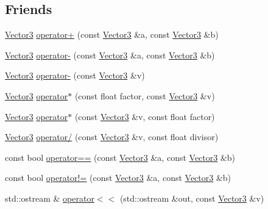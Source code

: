 \subsection*{Friends}
\begin{DoxyCompactItemize}
\item 
\hyperlink{classprism_1_1geometry_1_1_vector3}{Vector3} \hyperlink{classprism_1_1geometry_1_1_vector3_a2f3fba6fd08b1a9ee79193581edead97}{operator+} (const \hyperlink{classprism_1_1geometry_1_1_vector3}{Vector3} \&a, const \hyperlink{classprism_1_1geometry_1_1_vector3}{Vector3} \&b)
\item 
\hyperlink{classprism_1_1geometry_1_1_vector3}{Vector3} \hyperlink{classprism_1_1geometry_1_1_vector3_a4f0726718533ef9da9956faccc4eb5b5}{operator-\/} (const \hyperlink{classprism_1_1geometry_1_1_vector3}{Vector3} \&a, const \hyperlink{classprism_1_1geometry_1_1_vector3}{Vector3} \&b)
\item 
\hyperlink{classprism_1_1geometry_1_1_vector3}{Vector3} \hyperlink{classprism_1_1geometry_1_1_vector3_a0b83b76136fcd64d3d12f50db5db223f}{operator-\/} (const \hyperlink{classprism_1_1geometry_1_1_vector3}{Vector3} \&v)
\item 
\hyperlink{classprism_1_1geometry_1_1_vector3}{Vector3} \hyperlink{classprism_1_1geometry_1_1_vector3_abc31e90d1677fde0ca1ff3e23daae851}{operator$\ast$} (const float factor, const \hyperlink{classprism_1_1geometry_1_1_vector3}{Vector3} \&v)
\item 
\hyperlink{classprism_1_1geometry_1_1_vector3}{Vector3} \hyperlink{classprism_1_1geometry_1_1_vector3_ae7fd15d5dffc5c611e611998321df833}{operator$\ast$} (const \hyperlink{classprism_1_1geometry_1_1_vector3}{Vector3} \&v, const float factor)
\item 
\hyperlink{classprism_1_1geometry_1_1_vector3}{Vector3} \hyperlink{classprism_1_1geometry_1_1_vector3_a9f4ae4eea6c149a0cd72a692d737327d}{operator/} (const \hyperlink{classprism_1_1geometry_1_1_vector3}{Vector3} \&v, const float divisor)
\item 
const bool \hyperlink{classprism_1_1geometry_1_1_vector3_a71b0a5a5af557f64264c6e48949a8435}{operator==} (const \hyperlink{classprism_1_1geometry_1_1_vector3}{Vector3} \&a, const \hyperlink{classprism_1_1geometry_1_1_vector3}{Vector3} \&b)
\item 
const bool \hyperlink{classprism_1_1geometry_1_1_vector3_ace6e7ad2bf23c3246652c9b115b8e7fc}{operator!=} (const \hyperlink{classprism_1_1geometry_1_1_vector3}{Vector3} \&a, const \hyperlink{classprism_1_1geometry_1_1_vector3}{Vector3} \&b)
\item 
std\+::ostream \& \hyperlink{classprism_1_1geometry_1_1_vector3_a6b8025c0424ba8db565d3153d8dc9c0e}{operator$<$$<$} (std\+::ostream \&out, const \hyperlink{classprism_1_1geometry_1_1_vector3}{Vector3} \&v)
\end{DoxyCompactItemize}


